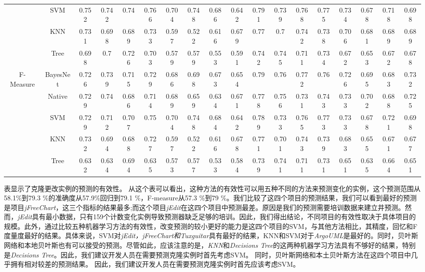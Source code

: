 {\begin{table*}[ht]
\begin{tabular}{|c|c|c|c|c|c|c|c|c|c|c|c|c|c|c|c|c|c|}
&SVM&	0.752&	0.742&	0.74&	0.766&		0.704&	0.748&	0.686&	0.642&		0.791&	0.739&	0.768&	0.775&		0.734&	0.678&	0.718&	0.698\\
&KNN&	0.731&	0.698&	0.689&	0.733&		0.597&	0.522&	0.616&	0.679&		0.77&	0.7	&0.742&	0.738&		0.706&	0.681&	0.689&	0.689\\
&Tree&	0.698&	0.7	&0.726&	0.703&		0.579&	0.579&	0.553&	0.591&		0.742&	0.745&	0.711&	0.734&		0.672&	0.653&	0.672&	0.678\\
\hline
\multirow{5}{*}{F-Measure}
&BayesNet&	0.726&	0.739&	0.715&	0.729&		0.686&	0.698&	0.673&	0.654&		0.79&	0.76&	0.772&	0.76&		0.726&	0.695&	0.683&	0.732\\
&Native&	0.729&	0.74&	0.686&	0.714&		0.689&	0.659&	0.634&	0.671&		0.778&	0.756&	0.731&	0.743&		0.733&	0.702&	0.688&	0.725\\
&SVM&	0.729&	0.712&	0.707&	0.75&	0.704&	0.748&	0.684&	0.642&		0.789&	0.733	&0.765&	0.773&		0.733&	0.678&	0.721&	0.698\\
&KNN&	0.732&	0.694&	0.688&	0.727&		0.597&	0.522&	0.616&	0.678&		0.771&	0.701&	0.743&	0.739&		0.683&	0.655&	0.671&	0.677\\
&Tree&	0.632&	0.634&	0.694&	0.635&		0.573&	0.577&	0.533&	0.584&		0.739&	0.741&	0.711&	0.731&		0.651&	0.635&	0.664&	0.651\\
\hline
\end{tabular}
\end{table*}

表显示了克隆更改实例的预测的有效性。
从这个表可以看出，这种方法的有效性可以用五种不同的方法来预测变化的实例，这个预测范围从58.1\%到79.3 \%的准确度从57.9\%回归到79.1 \%，F-measure从57.3 \%到79 \%。我们比较了这四个项目的预测结果，我们可以看到最好的预测是项目{\em  jFreeChart}，这三个指标的结果最多;而这个项目{\em jEdit}在这四个项目中预测最差。原因是我们的预测需要培训数据来建立井预测。然而，{\em jEdit}具有最小数据，只有159个计数变化实例导致预测器缺乏足够的培训。因此，我们得出结论，不同项目的有效性取决于具体项目的规模。此外，通过比较五种机器学习方法的有效性，改变预测的较小更好的能力是这四个项目的SVM，与其他方法相比，其精度，回忆和F度量度最好的结果。具体来说，SVM对{\em jEdit，jFreeChart和Tuxguitar}具有最好的结果，KNN和SVM对于{\em ArgoUML}是最好的。同时，贝叶斯网络和本地贝叶斯也有可以接受的预测。尽管如此，应该注意的是，{\em KNN}和{\em Decisions Tree}的这两种机器学习方法具有不够好的结果，特别是{\em Decisions Tree}。因此，我们建议开发人员在需要预测克隆实例时首先考虑SVM。
同时，贝叶斯网络和本土贝叶斯方法在这四个项目中几乎拥有相对较差的预测结果。
因此，我们建议开发人员在需要预测克隆实例时首先应该考虑SVM。

}
